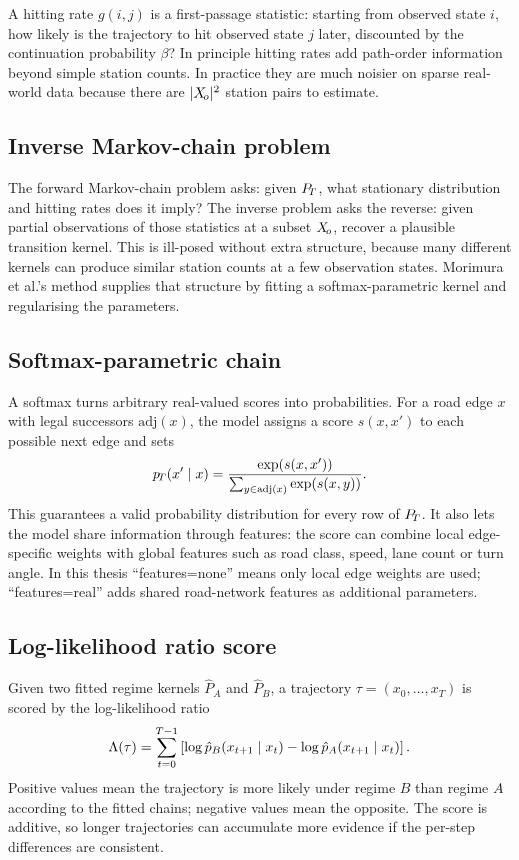 A hitting rate $g(i,j)$ is a first-passage statistic: starting from
observed state $i$, how likely is the trajectory to hit observed state
$j$ later, discounted by the continuation probability $\beta$? In
principle hitting rates add path-order information beyond simple
station counts. In practice they are much noisier on sparse real-world
data because there are $|X_{\!o}|^2$ station pairs to estimate.

\subsection{Inverse Markov-chain problem}
\label{app:inverse-mc-primer}

The forward Markov-chain problem asks: given $P_{\!T}$, what stationary
distribution and hitting rates does it imply? The inverse problem asks
the reverse: given partial observations of those statistics at a subset
$X_{\!o}$, recover a plausible transition kernel. This is ill-posed without
extra structure, because many different kernels can produce similar
station counts at a few observation states. Morimura et al.'s method
\cite{morimura2013} supplies that structure by fitting a
softmax-parametric kernel and regularising the parameters.

\subsection{Softmax-parametric chain}
\label{app:softmax-primer}

A softmax turns arbitrary real-valued scores into probabilities. For a
road edge $x$ with legal successors $\mathrm{adj}(x)$, the model assigns
a score $s(x,x')$ to each possible next edge and sets
\[
p_{\!T}(x'\mid x)=
\frac{\exp(s(x,x'))}
{\sum_{y\in \mathrm{adj}(x)}\exp(s(x,y))}.
\]
This guarantees a valid probability distribution for every row of
$P_{\!T}$. It also lets the model share information through features:
the score can combine local edge-specific weights with global features
such as road class, speed, lane count or turn angle. In this thesis
``features=none'' means only local edge weights are used; ``features=real''
adds shared road-network features as additional parameters.

\subsection{Log-likelihood ratio score}
\label{app:llr-primer}

Given two fitted regime kernels $\hat{P}_A$ and $\hat{P}_B$, a trajectory
$\tau=(x_0,\ldots,x_T)$ is scored by the log-likelihood ratio
\[
\Lambda(\tau)=
\sum_{t=0}^{T-1}\left[
\log \hat{p}_B(x_{t+1}\mid x_t)
-\log \hat{p}_A(x_{t+1}\mid x_t)
\right].
\]
Positive values mean the trajectory is more likely under regime $B$ than
regime $A$ according to the fitted chains; negative values mean the
opposite. The score is additive, so longer trajectories can accumulate
more evidence if the per-step differences are consistent.

